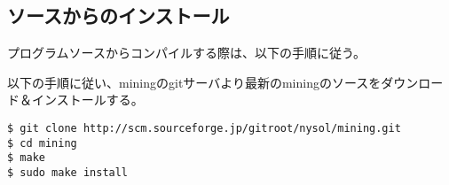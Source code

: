 \subsection{ソースからのインストール\label{sect:install_source}}
プログラムソースからコンパイルする際は、以下の手順に従う。

以下の手順に従い、miningのgitサーバより最新のminingのソースをダウンロード＆インストールする。

\begin{Verbatim}[baselinestretch=0.7,frame=single]
$ git clone http://scm.sourceforge.jp/gitroot/nysol/mining.git
$ cd mining
$ make
$ sudo make install
\end{Verbatim}


%
